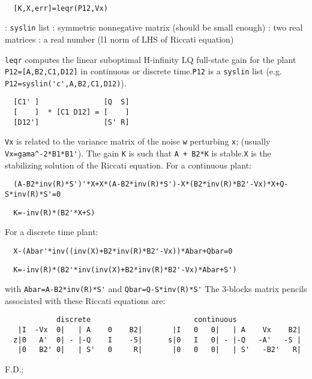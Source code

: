 \begin{mandesc}
   \\ %
\end{mandesc}
\begin{calling_sequence}
\begin{verbatim}
  [K,X,err]=leqr(P12,Vx)  
\end{verbatim}
\end{calling_sequence}
\begin{parameters}
  \begin{varlist}
    : \verb!syslin! list
    : symmetric nonnegative matrix (should be small enough)
    : two real matrices
    : a real number (l1 norm of LHS of Riccati equation)
  \end{varlist}
\end{parameters}
\begin{mandescription}
  \verb!leqr!  computes the linear suboptimal H-infinity LQ full-state gain
  for the plant \verb!P12=[A,B2,C1,D12]! in continuous or discrete time.\verb!P12! is a \verb!syslin! list (e.g. \verb!P12=syslin('c',A,B2,C1,D12)!).
\begin{verbatim}
  [C1' ]               [Q  S]
  [    ]  * [C1 D12] = [    ]
  [D12']               [S' R]
\end{verbatim}
\verb!Vx! is related to the variance matrix of the noise \verb!w! perturbing \verb!x!;
(usually \verb!Vx=gama^-2*B1*B1'!).
The gain \verb!K! is such that \verb!A + B2*K! is stable.\verb!X! is the stabilizing solution of the Riccati equation.
For a continuous plant:
\begin{verbatim}
  (A-B2*inv(R)*S')'*X+X*(A-B2*inv(R)*S')-X*(B2*inv(R)*B2'-Vx)*X+Q-S*inv(R)*S'=0
\end{verbatim}
\begin{verbatim}
  K=-inv(R)*(B2'*X+S)
\end{verbatim}
For a discrete time plant:
\begin{verbatim}
  X-(Abar'*inv((inv(X)+B2*inv(R)*B2'-Vx))*Abar+Qbar=0
\end{verbatim}
\begin{verbatim}
  K=-inv(R)*(B2'*inv(inv(X)+B2*inv(R)*B2'-Vx)*Abar+S')
\end{verbatim}
with \verb!Abar=A-B2*inv(R)*S'! and \verb!Qbar=Q-S*inv(R)*S'!
The 3-blocks matrix pencils associated with these Riccati equations are:
\begin{verbatim}
            discrete                        continuous
   |I  -Vx  0|   | A    0    B2|       |I   0   0|   | A    Vx    B2|
  z|0   A'  0| - |-Q    I    -S|      s|0   I   0| - |-Q   -A'   -S |
   |0   B2' 0|   | S'   0     R|       |0   0   0|   | S'   -B2'   R|
\end{verbatim}
\end{mandescription}
\begin{manseealso}
\end{manseealso}
\begin{authors}
  F.D.;   
\end{authors}
